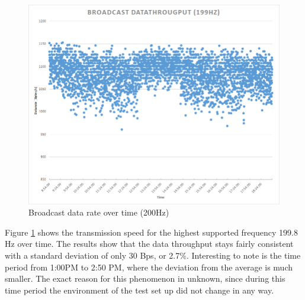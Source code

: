\begin{description}
	\begin{figure}[h]
		\centering
		\includegraphics[scale=0.5]{content/images/exp1_long.png}
		\caption{Broadcast data rate over time (200Hz)}\label{fig:exp1long}
	\end{figure}
	Figure \ref{fig:exp1long} shows the transmission speed for the highest supported frequency 199.8 Hz over time. The results show that the data throughput stays fairly consistent with a standard deviation of only 30 Bps, or 2.7\%. Interesting to note is the time period from 1:00PM to 2:50 PM, where the deviation from the average is much smaller. The exact reason for this phenomenon in unknown, since during this time period the environment of the test set up did not change in any way.
\end{description}
\newpage

